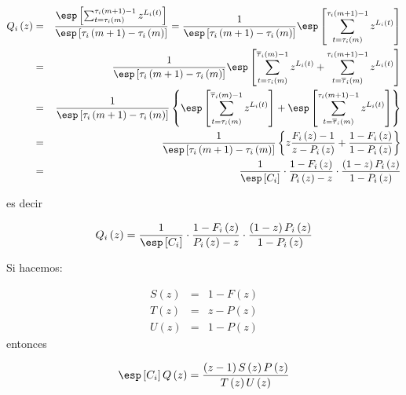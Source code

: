 \begin{eqnarray*}
Q_{i}\left(z\right)&=&\frac{\esp\left[\sum_{t=\tau_{i}\left(m\right)}^{\tau_{i}\left(m+1\right)-1}z^{L_{i}\left(t\right)}\right]}{\esp\left[\tau_{i}\left(m+1\right)-\tau_{i}\left(m\right)\right]}
=\frac{1}{\esp\left[\tau_{i}\left(m+1\right)-\tau_{i}\left(m\right)\right]}
\esp\left[\sum_{t=\tau_{i}\left(m\right)}^{\tau_{i}\left(m+1\right)-1}z^{L_{i}\left(t\right)}\right]\\
&=&\frac{1}{\esp\left[\tau_{i}\left(m+1\right)-\tau_{i}\left(m\right)\right]}
\esp\left[\sum_{t=\tau_{i}\left(m\right)}^{\overline{\tau}_{i}\left(m\right)-1}z^{L_{i}\left(t\right)}
+\sum_{t=\overline{\tau}_{i}\left(m\right)}^{\tau_{i}\left(m+1\right)-1}z^{L_{i}\left(t\right)}\right]\\
&=&\frac{1}{\esp\left[\tau_{i}\left(m+1\right)-\tau_{i}\left(m\right)\right]}\left\{
\esp\left[\sum_{t=\tau_{i}\left(m\right)}^{\overline{\tau}_{i}\left(m\right)-1}z^{L_{i}\left(t\right)}\right]
+\esp\left[\sum_{t=\overline{\tau}_{i}\left(m\right)}^{\tau_{i}\left(m+1\right)-1}z^{L_{i}\left(t\right)}\right]\right\}\\
&=&\frac{1}{\esp\left[\tau_{i}\left(m+1\right)-\tau_{i}\left(m\right)\right]}\left\{
z\frac{F_{i}\left(z\right)-1}{z-P_{i}\left(z\right)}+\frac{1-F_{i}\left(z\right)}{1-P_{i}\left(z\right)}
\right\}\\
&=&\frac{1}{\esp\left[C_{i}\right]}\cdot\frac{1-F_{i}\left(z\right)}{P_{i}\left(z\right)-z}\cdot\frac{\left(1-z\right)P_{i}\left(z\right)}{1-P_{i}\left(z\right)}
\end{eqnarray*}

es decir

\begin{equation}
Q_{i}\left(z\right)=\frac{1}{\esp\left[C_{i}\right]}\cdot\frac{1-F_{i}\left(z\right)}{P_{i}\left(z\right)-z}\cdot\frac{\left(1-z\right)P_{i}\left(z\right)}{1-P_{i}\left(z\right)}
\end{equation}


Si hacemos:

\begin{eqnarray}
S\left(z\right)&=&1-F\left(z\right)\\
T\left(z\right)&=&z-P\left(z\right)\\
U\left(z\right)&=&1-P\left(z\right)
\end{eqnarray}
entonces 

\begin{eqnarray}
\esp\left[C_{i}\right]Q\left(z\right)=\frac{\left(z-1\right)S\left(z\right)P\left(z\right)}{T\left(z\right)U\left(z\right)}
\end{eqnarray}

